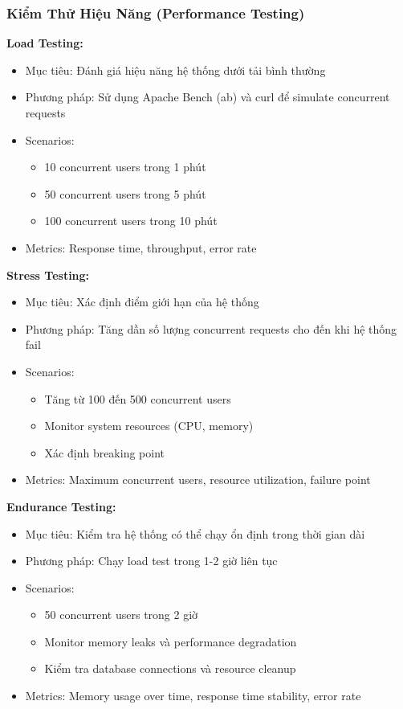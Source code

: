 \subsubsection{Kiểm Thử Hiệu Năng (Performance Testing)}

\textbf{Load Testing:}
\begin{itemize}
    \item Mục tiêu: Đánh giá hiệu năng hệ thống dưới tải bình thường
    \item Phương pháp: Sử dụng Apache Bench (ab) và curl để simulate concurrent requests
    \item Scenarios:
        \begin{itemize}
            \item 10 concurrent users trong 1 phút
            \item 50 concurrent users trong 5 phút
            \item 100 concurrent users trong 10 phút
        \end{itemize}
    \item Metrics: Response time, throughput, error rate
\end{itemize}

\textbf{Stress Testing:}
\begin{itemize}
    \item Mục tiêu: Xác định điểm giới hạn của hệ thống
    \item Phương pháp: Tăng dần số lượng concurrent requests cho đến khi hệ thống fail
    \item Scenarios:
        \begin{itemize}
            \item Tăng từ 100 đến 500 concurrent users
            \item Monitor system resources (CPU, memory)
            \item Xác định breaking point
        \end{itemize}
    \item Metrics: Maximum concurrent users, resource utilization, failure point
\end{itemize}

\textbf{Endurance Testing:}
\begin{itemize}
    \item Mục tiêu: Kiểm tra hệ thống có thể chạy ổn định trong thời gian dài
    \item Phương pháp: Chạy load test trong 1-2 giờ liên tục
    \item Scenarios:
        \begin{itemize}
            \item 50 concurrent users trong 2 giờ
            \item Monitor memory leaks và performance degradation
            \item Kiểm tra database connections và resource cleanup
        \end{itemize}
    \item Metrics: Memory usage over time, response time stability, error rate
\end{itemize}

